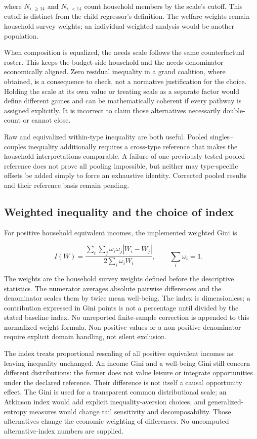 \documentclass[11pt,a4paper]{article}
\begin{document}
where \(N_{i,\ge14}\) and \(N_{i,<14}\) count household members by the scale's cutoff. This cutoff is distinct from the child regressor's definition. The welfare weights remain household survey weights; an individual-weighted analysis would be another population.

When composition is equalized, the needs scale follows the same counterfactual roster. This keeps the budget-side household and the needs denominator economically aligned. Zero residual inequality in a grand coalition, where obtained, is a consequence to check, not a normative justification for the choice. Holding the scale at its own value or treating scale as a separate factor would define different games and can be mathematically coherent if every pathway is assigned explicitly. It is incorrect to claim those alternatives necessarily double-count or cannot close.

Raw and equivalized within-type inequality are both useful. Pooled singles--couples inequality additionally requires a cross-type reference that makes the household interpretations comparable. A failure of one previously tested pooled reference does not prove all pooling impossible, but neither may type-specific offsets be added simply to force an exhaustive identity. Corrected pooled results and their reference basis remain pending.

\subsection{Weighted inequality and the choice of index}\label{weighted-inequality-and-the-choice-of-index}

For positive household equivalent incomes, the implemented weighted Gini is

\[I(W)=\frac{\sum_i\sum_j\omega_i\omega_j|W_i-W_j|}{2\sum_i\omega_iW_i},\qquad\sum_i\omega_i=1.\]

The weights are the household survey weights defined before the descriptive statistics. The numerator averages absolute pairwise differences and the denominator scales them by twice mean well-being. The index is dimensionless; a contribution expressed in Gini points is not a percentage until divided by the stated baseline index. No unreported finite-sample correction is appended to this normalized-weight formula. Non-positive values or a non-positive denominator require explicit domain handling, not silent exclusion.

The index treats proportional rescaling of all positive equivalent incomes as leaving inequality unchanged. An income Gini and a well-being Gini still concern different distributions: the former does not value leisure or integrate opportunities under the declared reference. Their difference is not itself a causal opportunity effect. The Gini is used for a transparent common distributional scale; an Atkinson index would add explicit inequality-aversion choices, and generalized-entropy measures would change tail sensitivity and decomposability. Those alternatives change the economic weighting of differences. No uncomputed alternative-index numbers are supplied.
\end{document}
